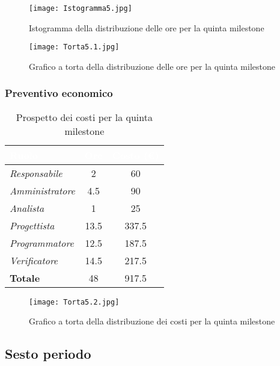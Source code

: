 \begin{figure}[H]
    \texttt{[image: Istogramma5.jpg]}
    \caption{Istogramma della distribuzione delle ore per la quinta milestone}
\end{figure}

\begin{figure}[H]
    \texttt{[image: Torta5.1.jpg]}
    \caption{Grafico a torta della distribuzione delle ore per la quinta milestone}
\end{figure}

\newpage
\subsubsection{Preventivo economico}

\begin{table}[H]
    \renewcommand\arraystretch{1.5}
    \centering
    \begin{tabular}{|l|c|c|}
    \hline
    \rowcolor[HTML]{036400}
    \textcolor{white}{\textbf{Ruolo}} & \multicolumn{1}{l|}{\textcolor{white}{\textbf{Ore}}} & \multicolumn{1}{l|}{\textcolor{white}{\textbf{Costo (€)}}} \\ \hline
    \rowcolor[HTML]{EFEFEF}\textit{Responsabile}   & 2    & 60     \\ \hline
    \rowcolor[HTML]{C0C0C0}\textit{Amministratore} & 4.5  & 90     \\ \hline
    \rowcolor[HTML]{EFEFEF}\textit{Analista}       & 1    & 25     \\ \hline
    \rowcolor[HTML]{C0C0C0}\textit{Progettista}    & 13.5 & 337.5  \\ \hline
    \rowcolor[HTML]{EFEFEF}\textit{Programmatore}  & 12.5 & 187.5  \\ \hline
    \rowcolor[HTML]{C0C0C0}\textit{Verificatore}   & 14.5 & 217.5  \\ \hline
    \rowcolor[HTML]{EFEFEF}\textbf{Totale}         & 48   & 917.5  \\ \hline
    \end{tabular}
    \caption{Prospetto dei costi per la quinta milestone}
\end{table}

\begin{figure}[H]
    \texttt{[image: Torta5.2.jpg]}
    \caption{Grafico a torta della distribuzione dei costi per la quinta milestone}
\end{figure}

\subsection{Sesto periodo}

